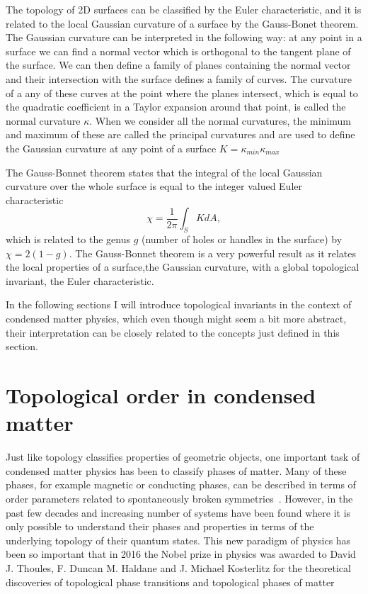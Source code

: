 The topology of 2D surfaces can be classified by the Euler characteristic, and it is related to the local Gaussian curvature of a surface by the Gauss-Bonet theorem. The Gaussian curvature can be interpreted in the following way: at any point in a surface we can find a normal vector which is orthogonal to the tangent plane of the surface. We can then define a family of planes containing the normal vector and their intersection with the surface defines a family of curves. The curvature of a any of these curves at the point where the planes intersect, which is equal to the quadratic coefficient in a Taylor expansion around that point, is called the normal curvature $\kappa$. When we consider all the normal curvatures, the minimum and maximum of these are called the principal curvatures and are used to define the Gaussian curvature at any point of a surface $K=\kappa_{min}\kappa_{max}$~\cite{differential_topology_and_geometry} 

The Gauss-Bonnet theorem states that the integral of the local Gaussian curvature over the whole surface is equal to the integer valued Euler characteristic
%
\begin{equation}
	\chi = \frac{1}{2\pi}\int_S K dA,
	\label{eq:euler_characteristic}
\end{equation}
%
which is related to the genus $g$ (number of holes or handles in the surface) by $\chi=2(1-g)$. The Gauss-Bonnet theorem is a very powerful result as it relates the local properties of a surface,the Gaussian curvature, with a global topological invariant, the Euler characteristic. 

In the following sections I will introduce topological invariants in the context of condensed matter physics, which even though might seem a bit more abstract, their interpretation can be closely related to the concepts just defined in this section. 

\section{Topological order in condensed matter}

Just like topology classifies properties of geometric objects, one important task of condensed matter physics has been to classify phases of matter. Many of these phases, for example magnetic or conducting phases, can be described in terms of order parameters related to spontaneously broken symmetries~\cite{landau_theory_1936}. However, in the past few decades and increasing number of systems have been found where it is only possible to understand their phases and properties in terms of the underlying topology of their quantum states. This new paradigm of physics has been so important that in 2016 the Nobel prize in physics was awarded to David J. Thoules, F. Duncan M. Haldane and J. Michael Kosterlitz for the theoretical discoveries of topological phase transitions and topological phases of matter 

